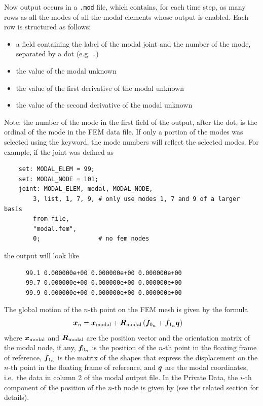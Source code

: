 Now output occurs in a \texttt{.mod} file, which contains, for each time step,
as many rows as all the modes of all the modal elements whose output is enabled.
Each row is structured as follows:
\begin{itemize}
\item a field containing the label of the modal joint and the number of the mode,
separated by a dot (e.g. \texttt{.})
\item the value of the modal unknown
\item the value of the first derivative of the modal unknown
\item the value of the second derivative of the modal unknown
\end{itemize}
Note: the number of the mode in the first field of the output, after the dot,
is the ordinal of the mode in the FEM data file.
If only a portion of the modes was selected using the  keyword,
the mode numbers will reflect the selected modes.
For example, if the  joint was defined as
\begin{verbatim}
    set: MODAL_ELEM = 99;
    set: MODAL_NODE = 101;
    joint: MODAL_ELEM, modal, MODAL_NODE,
        3, list, 1, 7, 9, # only use modes 1, 7 and 9 of a larger basis
        from file,
        "modal.fem",
        0;                # no fem nodes
\end{verbatim}
the output will look like
\begin{verbatim}
      99.1 0.000000e+00 0.000000e+00 0.000000e+00
      99.7 0.000000e+00 0.000000e+00 0.000000e+00
      99.9 0.000000e+00 0.000000e+00 0.000000e+00
\end{verbatim}
The global motion of the $n$-th point on the FEM mesh is given by the formula
\begin{align}
	\boldsymbol{x}_n
	&=
	\boldsymbol{x}_\text{modal}
	+
	\boldsymbol{R}_\text{modal} \left( 
		\boldsymbol{f}_{0_n}
		+
		\boldsymbol{f}_{1_n} \boldsymbol{q}
	 \right)
\end{align}
where $\boldsymbol{x}_\text{modal}$ and $\boldsymbol{R}_\text{modal}$
are the position vector and the orientation matrix of the modal node, if any,
$\boldsymbol{f}_{0_n}$ is the position of the $n$-th point in the floating frame of reference,
$\boldsymbol{f}_{1_n}$ is the matrix of the shapes that express the displacement on the $n$-th point
in the floating frame of reference, and $\boldsymbol{q}$ are the modal coordinates,
i.e.\ the data in column 2 of the modal output file.
In the Private Data, the $i$-th component of the position of the $n$-th node
is given by  (see the related section for details).



